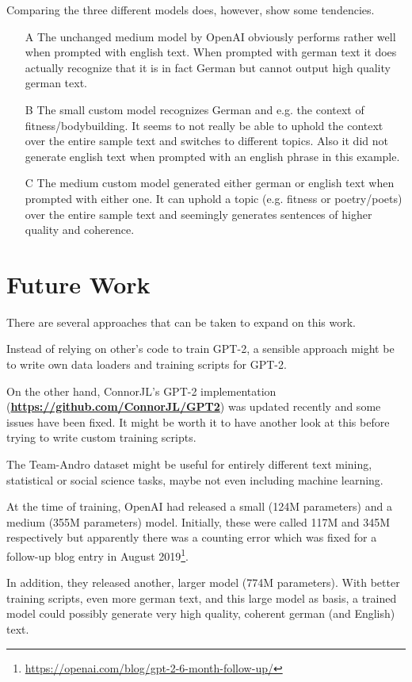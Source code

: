 \documentclass{scrartcl}
\newcommand{\burl}[1]{\textbf{\url{#1}}}
\begin{document}
Comparing the three different models does, however, show some tendencies. 
\begin{itemize}
	\item[A] The unchanged medium model by OpenAI obviously performs rather well when prompted with english text. When prompted with german text it does actually recognize that it is in fact German but cannot output high quality german text.
	\item[B] The small custom model recognizes German and e.g. the context of fitness/bodybuilding. It seems to not really be able to uphold the context over the entire sample text and switches to different topics. Also it did not generate english text when prompted with an english phrase in this example.
	\item[C] The medium custom model generated either german or english text when prompted with either one. It can uphold a topic (e.g. fitness or poetry/poets) over the entire sample text and seemingly generates sentences of higher quality and coherence.
\end{itemize}


\section{Future Work}
\label{sec:FW}
There are several approaches that can be taken to expand on this work.

Instead of relying on other's code to train GPT-2, a sensible approach might be to write own data loaders and training scripts for GPT-2.

On the other hand, ConnorJL's GPT-2 implementation (\burl{https://github.com/ConnorJL/GPT2}) was updated recently and some issues have been fixed. It might be worth it to have another look at this before trying to write custom training scripts.

The Team-Andro dataset might be useful for entirely different text mining, statistical or social science tasks, maybe not even including machine learning.

At the time of training, OpenAI had released a small (124M parameters) and a medium (355M parameters) model. Initially, these were called 117M and 345M respectively but apparently there was a counting error which was fixed for a follow-up blog entry in August 2019\footnote{\url{https://openai.com/blog/gpt-2-6-month-follow-up/}}.

In addition, they released another, larger model (774M parameters). 
With better training scripts, even more german text, and this large model as basis, a trained model could possibly generate very high quality, coherent german (and English) text.
\end{document}
